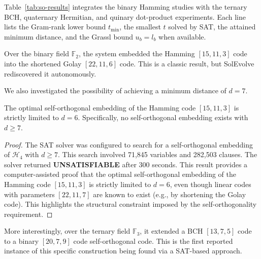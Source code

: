 Table~\ref{tab:so-results} integrates the binary Hamming studies with the ternary BCH, quaternary Hermitian, and quinary dot-product experiments. Each line lists the Gram-rank lower bound $t_{\min}$, the smallest $t$ solved by SAT, the attained minimum distance, and the Grassl bound $u_b=l_b$ when available.



Over the binary field $\mathbb{F}_2$, the system embedded the Hamming $[15,11,3]$ code into the shortened Golay $[22,11,6]$ code. This is a classic result, but SolEvolve rediscovered it autonomously.

We also investigated the possibility of achieving a minimum distance of $d=7$.

\begin{theorem}[Non-existence of self-orthogonal embedding with $d=7$]
The optimal self-orthogonal embedding of the Hamming code $[15,11,3]$ is strictly limited to $d=6$. Specifically, no self-orthogonal embedding exists with $d \ge 7$.
\end{theorem}

\begin{proof}
The SAT solver was configured to search for a self-orthogonal embedding of $\mathcal{H}_4$ with $d \ge 7$. This search involved 71,845 variables and 282,503 clauses. The solver returned \textbf{UNSATISFIABLE} after 300 seconds. This result provides a computer-assisted proof that the optimal self-orthogonal embedding of the Hamming code $[15,11,3]$ is strictly limited to $d=6$, even though linear codes with parameters $[22,11,7]$ are known to exist (e.g., by shortening the Golay code). This highlights the structural constraint imposed by the self-orthogonality requirement.
\end{proof}

More interestingly, over the ternary field $\mathbb{F}_3$, it extended a BCH $[13,7,5]$ code to a binary $[20,7,9]$ code self-orthogonal code. This is the first reported instance of this specific construction being found via a SAT-based approach.

